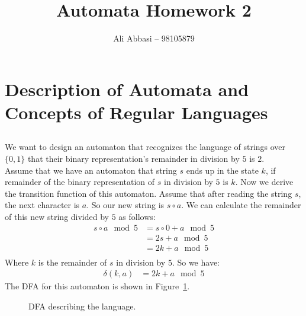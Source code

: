 \documentclass{article}
\title{Automata Homework 2}
\author{Ali Abbasi -- 98105879}
\numberwithin{equation}{subsection}
\begin{document}
\maketitle
\tableofcontents
\pagebreak

\section{Description of Automata and Concepts of Regular Languages}
\subsection{}
\subsubsection{}
We want to design an automaton that recognizes the language of strings over \(\{0, 1\}\) that their binary representation's remainder in division by \(5\) is \(2\).\\
Assume that we have an automaton that string \(s\) ends up in the state \(k\), if remainder of the binary representation of \(s\) in division by \(5\) is \(k\).
Now we derive the transition function of this automaton.
Assume that after reading the string \(s\), the next character is \(a\).
So our new string is \(s\circ a\). 
We can calculate the remainder of this new string divided by \(5\) as follows:
\begin{align}
s\circ a \mod 5 &= s\circ 0 + a \mod 5\\
&= 2s + a \mod 5\\
&= 2k + a \mod 5\\
\end{align}
Where \(k\) is the remainder of \(s\) in division by \(5\).
So we have:
\begin{align}
\delta(k, a) &= 2k + a \mod 5
\end{align}
The DFA for this automaton is shown in Figure~\ref{fig:automata1-1-1}.
\begin{figure}[H]
\centering

\caption{DFA describing the language.}
\label{fig:automata1-1-1}
\end{figure}
\end{document}
